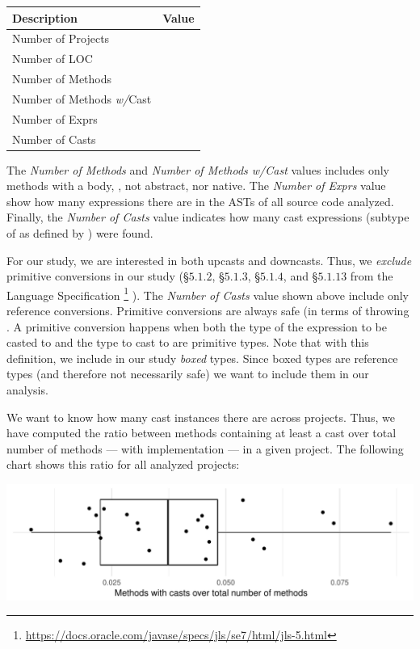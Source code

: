 \begin{center}
\begin{tabular}{lr}
	Description & Value\\
	\hline
	Number of Projects & \nproject{} \\
	Number of LOC & \nloc{} \\
	Number of Methods & \nmethod{} \\
	Number of Methods \emph{w/}Cast & \nmethodwithcast{} \\
	Number of Exprs & \nexpr{} \\
	Number of Casts & \ncast{} \\
\end{tabular}
\end{center}

The \emph{Number of Methods} and \emph{Number of Methods w/Cast} values includes only methods with a body, \ie{}, not abstract, nor native.
The \emph{Number of Exprs} value show how many expressions there are in the ASTs of all source code analyzed.
Finally, the \emph{Number of Casts} value indicates how many cast expressions (subtype of  as defined by \ql{}) were found.

For our study, we are interested in both upcasts and downcasts.
Thus, we \emph{exclude} primitive conversions in our study
(\S$5.1.2$, \S$5.1.3$, \S$5.1.4$, and \S$5.1.13$ from the \java{} Language Specification%
\footnote{\url{https://docs.oracle.com/javase/specs/jls/se7/html/jls-5.html}}
).
The \emph{Number of Casts} value shown above include only reference conversions.
Primitive conversions are always safe (in terms of throwing .
A primitive conversion happens when both the type of the expression to be casted to and the type to cast to are primitive types.
Note that with this definition, we include in our study \emph{boxed} types.
Since boxed types are reference types (and therefore not necessarily safe)
we want to include them in our analysis.

We want to know how many cast instances there are across projects.
Thus, we have computed the ratio between methods containing at least a cast over total number of methods --- with implementation --- in a given project.
The following chart shows this ratio for all analyzed projects:

\includegraphics[width=\columnwidth]{stats-methodwcast.pdf}

